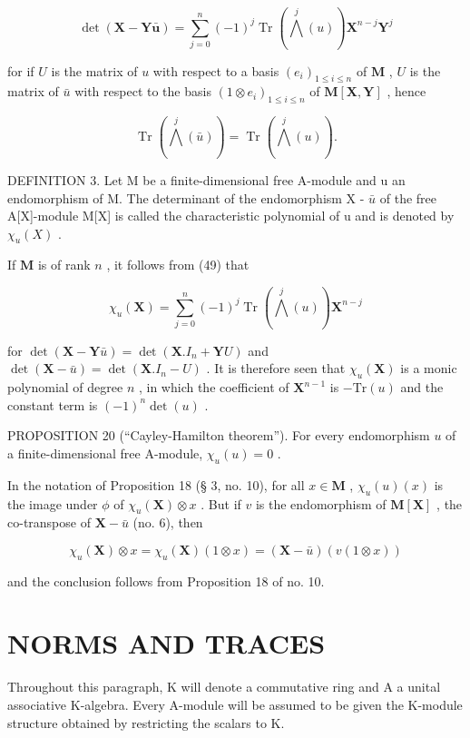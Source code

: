 \[
\det (\mathbf {X} - \mathbf {Y} \bar {\boldsymbol {u}}) = \sum_ {j = 0} ^ {n} (- 1) ^ {j} \operatorname{Tr} \left(\bigwedge^ {j} (u)\right) \mathbf {X} ^ {n - j} \mathbf {Y} ^ {j}\tag{49}
\]

for if \(U\) is the matrix of \(u\) with respect to a basis \((e_i)_{1 \leqslant i \leqslant n}\) of \(\mathbf{M}\) , \(U\) is the matrix of \(\bar{u}\) with respect to the basis \((1 \otimes e_i)_{1 \leqslant i \leqslant n}\) of \(\mathbf{M}[\mathbf{X}, \mathbf{Y}]\) , hence

\[
\operatorname{Tr} \left(\bigwedge^ {j} (\bar {u})\right) = \operatorname{Tr} \left(\bigwedge^ {j} (u)\right).
\]

DEFINITION 3. Let M be a finite-dimensional free A-module and u an endomorphism of M. The determinant of the endomorphism X - \(\bar{u}\) of the free A{[}X{]}-module M{[}X{]} is called the characteristic polynomial of u and is denoted by \(\chi_u(X)\) .

If \(\mathbf{M}\) is of rank \(n\) , it follows from (49) that

\[
\chi_ {u} (\mathbf {X}) = \sum_ {j = 0} ^ {n} (- 1) ^ {j} \operatorname{Tr} \left(\bigwedge^ {j} (u)\right) \mathbf {X} ^ {n - j}\tag{50}
\]

for \(\operatorname{det}(\mathbf{X} - \mathbf{Y}\bar{u}) = \operatorname{det}(\mathbf{X}.I_n + \mathbf{Y}U)\) and \(\operatorname{det}(\mathbf{X} - \bar{u}) = \operatorname{det}(\mathbf{X}.I_n - U)\) . It is therefore seen that \(\chi_u(\mathbf{X})\) is a monic polynomial of degree \(n\) , in which the coefficient of \(\mathbf{X}^{n-1}\) is \(-\mathrm{Tr}(u)\) and the constant term is \((-1)^n \operatorname{det}(u)\) .

PROPOSITION 20 (``Cayley-Hamilton theorem''). For every endomorphism \(u\) of a finite-dimensional free A-module, \(\chi_u(u) = 0\) .

In the notation of Proposition 18 (§ 3, no. 10), for all \(x \in \mathbf{M}\) , \(\chi_u(u)(x)\) is the image under \(\phi\) of \(\chi_u(\mathbf{X}) \otimes x\) . But if \(v\) is the endomorphism of \(\mathbf{M}[\mathbf{X}]\) , the co-transpose of \(\mathbf{X} - \bar{u}\) (no. 6), then

\[
\chi_ {u} (\mathbf {X}) \otimes x = \chi_ {u} (\mathbf {X}) (1 \otimes x) = (\mathbf {X} - \bar {u}) (v (1 \otimes x))
\]

and the conclusion follows from Proposition 18 of no. 10.

\section{NORMS AND TRACES}

Throughout this paragraph, K will denote a commutative ring and A a unital associative K-algebra. Every A-module will be assumed to be given the K-module structure obtained by restricting the scalars to K.
